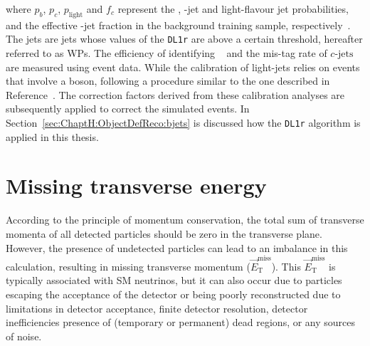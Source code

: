 where $p_{b}$, $p_{c}$, $p_{\text{light}}$ and $f_{c}$ represent the \bjet,
\Pcharm-jet and light-flavour jet probabilities, and
the effective \Pcharm-jet fraction in the background training sample, respectively~\cite{ATLAS:2022qxm}. 
The \btagged jets are jets whose values of the \texttt{DL1r} are above a certain threshold, hereafter referred to as WPs. 
The efficiency of identifying \bjets~\cite{FTAG-2018-01} and the mis-tag rate of 
\ensuremath{c\text{-jets}}~\cite{ATLAS-CONF-2018-001} are measured using \ttbar event data. 
While the calibration of light-jets relies on events that involve a \PZ boson, 
following a procedure similar to the one described in Reference~\cite{ATLAS-CONF-2018-006}. 
The correction factors derived from these calibration analyses are subsequently applied to correct 
the simulated events. 
In Section~\ref{sec:ChaptH:ObjectDefReco:bjets} is discussed how the \texttt{DL1r} algorithm
is applied in this thesis.





\section{Missing transverse energy}
\label{sec:Chap3:Reco:MET}
According to the principle of momentum conservation, the total sum of transverse 
momenta of all detected particles should be zero in the transverse plane. However, 
the presence of undetected particles can lead to an imbalance in this calculation, 
resulting in missing transverse momentum ($\overrightarrow{E}_{\text{T}}^{\text{miss}}$). 
This $\overrightarrow{E}_{\text{T}}^{\text{miss}}$ is typically associated with SM neutrinos, but it can also occur due 
to particles escaping the acceptance of the detector or being poorly reconstructed due to limitations in 
detector acceptance, finite detector resolution, detector inefficiencies presence of 
(temporary or permanent) dead regions, or any sources of noise.

